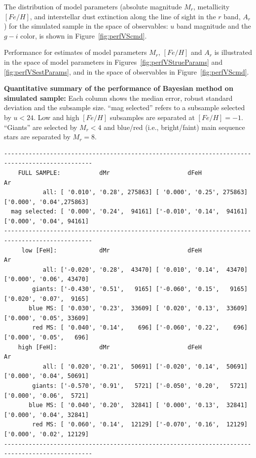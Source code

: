 The distribution of model parameters (absolute magnitude $M_r$,
metallicity $[Fe/H]$, and interstellar dust extinction along the line
of sight in the $r$ band, $A_r$) for the simulated sample in the space
of observables: $u$ band magnitude and the $g-i$ color, is shown in
Figure~\ref{fig:perfVScmd}.

Performance for estimates of model parameters $M_r$, $[Fe/H]$ and
$A_r$ is illustrated in the space of model parameters in Figures~\ref{fig:perfVStrueParams}
and \ref{fig:perfVSestParams}, and in the space of observables in
Figure~\ref{fig:perfVScmd}.  

 

\newpage

{\bf Quantitative summary of the performance of Bayesian method on simulated sample:}
Each column shows the median error, robust standard deviation and the subsample size. 
``mag selected'' refers to a subsample selected by $u < 24$. Low and high $[Fe/H]$ subsamples are
separated at $[Fe/H] = -1$. ``Giants'' are selected by $M_r<4$ and blue/red (i.e., bright/faint) main
sequence stars are separated by $M_r=8$.  

\begin{verbatim}
-----------------------------------------------------------------------------------------------
    FULL SAMPLE:           dMr                      dFeH                         Ar
           all: [ '0.010', '0.28', 275863] [ '0.000', '0.25', 275863] ['0.000', '0.04',275863]
  mag selected: [ '0.000', '0.24',  94161] ['-0.010', '0.14',  94161] ['0.000', '0.04', 94161]
-----------------------------------------------------------------------------------------------
     low [FeH]:            dMr                      dFeH                         Ar
           all: ['-0.020', '0.28',  43470] [ '0.010', '0.14',  43470] ['0.000', '0.06', 43470]
        giants: ['-0.430', '0.51',   9165] ['-0.060', '0.15',   9165] ['0.020', '0.07',  9165]
       blue MS: [ '0.030', '0.23',  33609] [ '0.020', '0.13',  33609] ['0.000', '0.05', 33609]
        red MS: [ '0.040', '0.14',    696] ['-0.060', '0.22',    696] ['0.000', '0.05',   696]
    high [FeH]:            dMr                      dFeH                         Ar
           all: [ '0.020', '0.21',  50691] ['-0.020', '0.14',  50691] ['0.000', '0.04', 50691]
        giants: ['-0.570', '0.91',   5721] ['-0.050', '0.20',   5721] ['0.000', '0.06',  5721]
       blue MS: [ '0.040', '0.20',  32841] [ '0.000', '0.13',  32841] ['0.000', '0.04', 32841]
        red MS: [ '0.060', '0.14',  12129] ['-0.070', '0.16',  12129] ['0.000', '0.02', 12129]
-----------------------------------------------------------------------------------------------
\end{verbatim}



